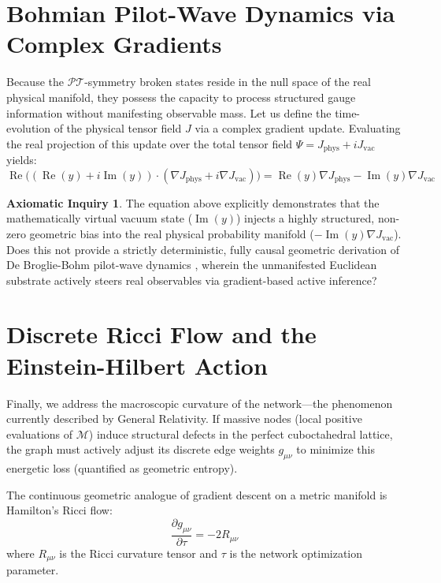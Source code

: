 \documentclass[11pt, letterpaper]{article}
\newcommand{\PT}{\mathcal{PT}}
\DeclareMathOperator{\ReOp}{Re}
\DeclareMathOperator{\ImOp}{Im}
\theoremstyle{definition}
\newtheorem{inquiry}{Axiomatic Inquiry}[section]
\theoremstyle{remark}
\begin{document}
\section{Bohmian Pilot-Wave Dynamics via Complex Gradients}

Because the $\PT$-symmetry broken states reside in the null space of the real physical manifold, they possess the capacity to process structured gauge information without manifesting observable mass. Let us define the time-evolution of the physical tensor field $J$ via a complex gradient update. Evaluating the real projection of this update over the total tensor field $\Psi = J_{\text{phys}} + i J_{\text{vac}}$ yields:
\begin{equation}
    \ReOp\Big( (\ReOp(y) + i \ImOp(y)) \cdot (\nabla J_{\text{phys}} + i \nabla J_{\text{vac}}) \Big) = \ReOp(y)\nabla J_{\text{phys}} - \ImOp(y)\nabla J_{\text{vac}}
\end{equation}

\begin{inquiry}
The equation above explicitly demonstrates that the mathematically virtual vacuum state ($\ImOp(y)$) injects a highly structured, non-zero geometric bias into the real physical probability manifold ($-\ImOp(y)\nabla J_{\text{vac}}$). Does this not provide a strictly deterministic, fully causal geometric derivation of De Broglie-Bohm pilot-wave dynamics \cite{Bohm1952}, wherein the unmanifested Euclidean substrate actively steers real observables via gradient-based active inference?
\end{inquiry}

\section{Discrete Ricci Flow and the Einstein-Hilbert Action}

Finally, we address the macroscopic curvature of the network---the phenomenon currently described by General Relativity. If massive nodes (local positive evaluations of $\mathcal{M}$) induce structural defects in the perfect cuboctahedral lattice, the graph must actively adjust its discrete edge weights $g_{\mu\nu}$ to minimize this energetic loss (quantified as geometric entropy).

The continuous geometric analogue of gradient descent on a metric manifold is Hamilton's Ricci flow:
\begin{equation}
    \frac{\partial g_{\mu\nu}}{\partial \tau} = -2R_{\mu\nu}
\end{equation}
where $R_{\mu\nu}$ is the Ricci curvature tensor and $\tau$ is the network optimization parameter.
\end{document}
